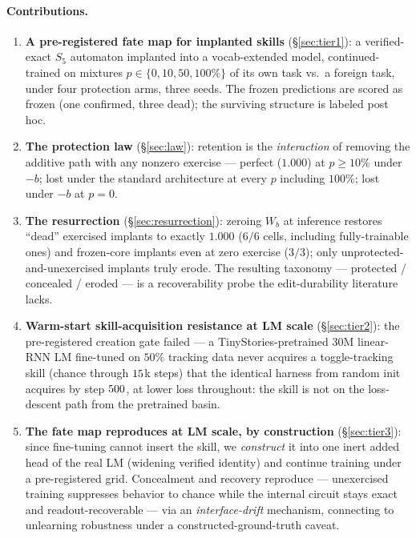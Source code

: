 \documentclass[10pt]{article}
\begin{document}
\paragraph{Contributions.}
\begin{enumerate}
\item \textbf{A pre-registered fate map for implanted skills} (\S\ref{sec:tier1}): a verified-exact
$S_5$ automaton implanted into a vocab-extended model, continued-trained on mixtures
$p\in\{0,10,50,100\%\}$ of its own task vs.\ a foreign task, under four protection arms, three
seeds. The frozen predictions are scored as frozen (one confirmed, three dead); the surviving
structure is labeled post hoc.
\item \textbf{The protection law} (\S\ref{sec:law}): retention is the \emph{interaction} of
removing the additive path with any nonzero exercise --- perfect ($1.000$) at $p\ge10\%$ under
$-b$; lost under the standard architecture at every $p$ including $100\%$; lost under $-b$ at
$p=0$.
\item \textbf{The resurrection} (\S\ref{sec:resurrection}): zeroing $W_b$ at inference restores
``dead'' exercised implants to exactly $1.000$ ($6/6$ cells, including fully-trainable ones) and
frozen-core implants even at zero exercise ($3/3$); only unprotected-and-unexercised implants
truly erode. The resulting taxonomy --- protected / concealed / eroded --- is a recoverability
probe the edit-durability literature lacks.
\item \textbf{Warm-start skill-acquisition resistance at LM scale} (\S\ref{sec:tier2}): the
pre-registered creation gate failed --- a TinyStories-pretrained 30M linear-RNN LM fine-tuned on
$50\%$ tracking data never acquires a toggle-tracking skill (chance through $15$k
steps) that the identical harness from random init acquires by step $500$, at lower
loss throughout: the skill is not on the loss-descent path from the pretrained basin.
\item \textbf{The fate map reproduces at LM scale, by construction} (\S\ref{sec:tier3}): since
fine-tuning cannot insert the skill, we \emph{construct} it into one inert added head of the real
LM (widening verified identity) and continue training under a pre-registered grid. Concealment and
recovery reproduce --- unexercised training suppresses behavior to chance while the internal circuit
stays exact and readout-recoverable --- via an \emph{interface-drift} mechanism, connecting to
unlearning robustness under a constructed-ground-truth caveat.
\end{enumerate}
\end{document}
